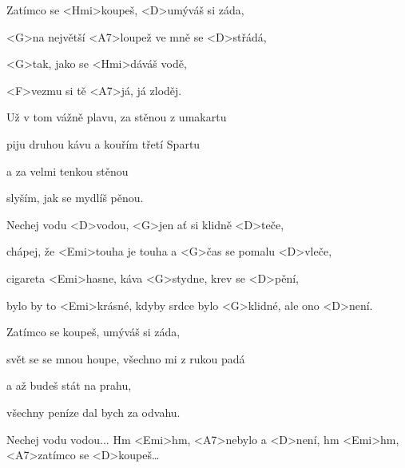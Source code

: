 

\zs
Zatímco se <Hmi>koupeš, <D>umýváš si záda,

<G>na největší <A7>loupež ve mně se <D>střádá,

<G\dim>tak, jako se <Hmi>dáváš vodě,

<F\dim>vezmu si tě <A7>já, já zloděj.
\ks

\zs
Už v tom vážně plavu, za stěnou z umakartu

piju druhou kávu a kouřím třetí Spartu

a za velmi tenkou stěnou

slyším, jak se mydlíš pěnou.
\ks

\zr
Nechej vodu <D>vodou, <G>jen ať si klidně <D>teče,

chápej, že <Emi>touha je touha a <G>čas se pomalu <D>vleče,

cigareta <Emi>hasne, káva <G>stydne, krev se <D>pění,

bylo by to <Emi>krásné, kdyby srdce bylo <G>klidné, ale ono <D>není.
\kr

\zs
Zatímco se koupeš, umýváš si záda,

svět se se mnou houpe, všechno mi z rukou padá

a až budeš stát na prahu,

všechny peníze dal bych za odvahu.
\ks

\zr
Nechej vodu vodou...
Hm <Emi>hm, <A7>nebylo a <D>není, hm <Emi>hm, <A7>zatímco se <D>koupeš…
\kr

\kp
